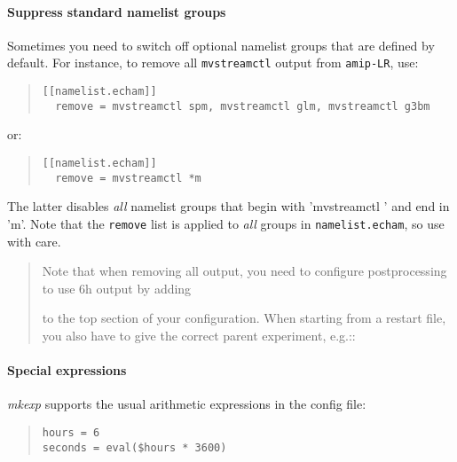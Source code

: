\paragraph*{Suppress standard namelist groups%
  \label{suppress-standard-namelist-groups}%
}

Sometimes you need to switch off optional namelist groups that are defined by
default. For instance, to remove all \texttt{mvstreamctl} output from
\texttt{amip-LR}, use:
%
\begin{quote}
\begin{verbatim}
[[namelist.echam]]
  remove = mvstreamctl spm, mvstreamctl glm, mvstreamctl g3bm
\end{verbatim}
\end{quote}

or:
%
\begin{quote}
\begin{verbatim}
[[namelist.echam]]
  remove = mvstreamctl *m
\end{verbatim}
\end{quote}

The latter disables \emph{all} namelist groups that begin with 'mvstreamctl '
and end in 'm'. Note that the \texttt{remove} list is applied to \emph{all}
groups in \texttt{namelist.echam}, so use with care.

\begin{quote}\colorbox{dgray}{\parbox{\linewidth}{ 
  Note that when removing all  output, you need to configure
  postprocessing to use 6h output by adding
  \begin{quote}
  \end{quote}
  to the top section of your configuration. When starting from a restart
  file, you also have to give the correct parent experiment, e.g.::
  \begin{quote}
  \end{quote}
}}\end{quote}


\paragraph*{Special expressions%
  \label{special-expressions}%
}

\emph{mkexp} supports the usual arithmetic expressions in the config file:
%
\begin{quote}
\begin{verbatim}
hours = 6
seconds = eval($hours * 3600)
\end{verbatim}
\end{quote}

